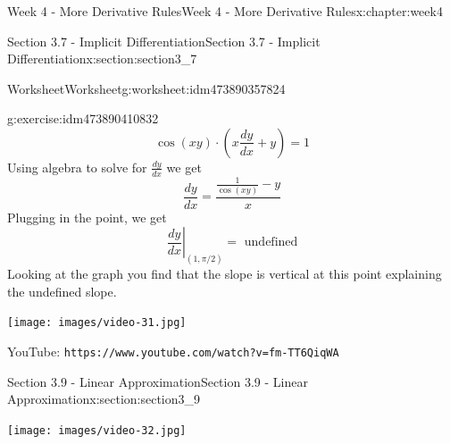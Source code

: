\documentclass[oneside,10pt,]{book}
\newcommand{\mono}[1]{\texttt{#1}}
\numberwithin{equation}{section}
\newlength{\qrsize}
\newlength{\previewwidth}
\begin{document}
\begin{chapterptx}{Week 4 - More Derivative Rules}{}{Week 4 - More Derivative Rules}{}{}{x:chapter:week4}
\begin{sectionptx}{Section 3.7 - Implicit Differentiation}{}{Section 3.7 - Implicit Differentiation}{}{}{x:section:section3_7}
\begin{worksheet-subsection}{Worksheet}{}{Worksheet}{}{}{g:worksheet:idm473890357824}
\begin{divisionexercise}{3}{}{}{g:exercise:idm473890410832}
\begin{equation*}
\cos(xy)\cdot \left( x \frac{dy}{dx}+y\right) = 1 
\end{equation*}
Using algebra to solve for \(\frac{dy}{dx}\) we get%
\begin{equation*}
\frac{dy}{dx} =\frac{\frac{1}{\cos(xy)}-y}{x} 
\end{equation*}
Plugging in the point, we get%
\begin{equation*}
\left. \frac{dy}{dx} \right\vert_{(1,\pi/2)} = \text{ undefined} 
\end{equation*}
Looking at the graph you find that the slope is vertical at this point explaining the undefined slope.%
\end{divisionexercise}%
\end{worksheet-subsection}
\restoregeometry
\setlength{\qrsize}{9em}
\setlength{\previewwidth}{\linewidth}
\addtolength{\previewwidth}{-\qrsize}
\begin{tcbraster}[raster columns=2, raster column skip=1pt, raster halign=center, raster force size=false, raster left skip=0pt, raster right skip=0pt]%
\begin{tcolorbox}[previewstyle, width=\previewwidth]%
\texttt{[image: images/video-31.jpg]}%
\end{tcolorbox}%
\begin{tcolorbox}[qrstyle]%
{\hypersetup{urlcolor=black}}%
\end{tcolorbox}%
\begin{tcolorbox}[captionstyle]%
\small YouTube: \mono{https://www.youtube.com/watch?v=fm-TT6QiqWA}\end{tcolorbox}%
\end{tcbraster}%
\end{sectionptx}
%
%
\typeout{************************************************}
\typeout{************************************************}
%
\begin{sectionptx}{Section 3.9 - Linear Approximation}{}{Section 3.9 - Linear Approximation}{}{}{x:section:section3_9}
\setlength{\qrsize}{9em}
\setlength{\previewwidth}{\linewidth}
\addtolength{\previewwidth}{-\qrsize}
\begin{tcbraster}[raster columns=2, raster column skip=1pt, raster halign=center, raster force size=false, raster left skip=0pt, raster right skip=0pt]%
\begin{tcolorbox}[previewstyle, width=\previewwidth]%
\texttt{[image: images/video-32.jpg]}%

\end{tcolorbox}
\end{tcbraster}
\end{sectionptx}
\end{chapterptx}
\end{document}

